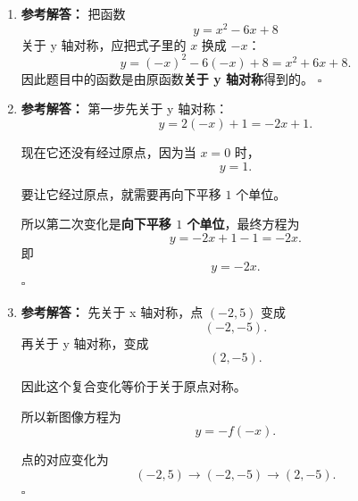 \documentclass[11pt,a4paper,fontset=fandol]{ctexart}
\newenvironment{solution}{\par\noindent\textbf{参考解答：}}{\hfill$\square$\par}
\begin{document}
\begin{enumerate}
  \item \begin{solution}
  把函数
  \[
  y=x^2-6x+8
  \]
  关于 y 轴对称，应把式子里的 $x$ 换成 $-x$：
  \[
  y=(-x)^2-6(-x)+8=x^2+6x+8.
  \]
  因此题目中的函数是由原函数\textbf{关于 y 轴对称}得到的。
  \end{solution}

  \item \begin{solution}
  第一步先关于 y 轴对称：
  \[
  y=2(-x)+1=-2x+1.
  \]

  现在它还没有经过原点，因为当 $x=0$ 时，
  \[
  y=1.
  \]

  要让它经过原点，就需要再向下平移 $1$ 个单位。

  所以第二次变化是\textbf{向下平移 $1$ 个单位}，最终方程为
  \[
  y=-2x+1-1=-2x.
  \]
  即
  \[
  \boxed{y=-2x}.
  \]
  \end{solution}

  \item \begin{solution}
  先关于 x 轴对称，点 $(-2,5)$ 变成
  \[
  (-2,-5).
  \]
  再关于 y 轴对称，变成
  \[
  (2,-5).
  \]

  因此这个复合变化等价于关于原点对称。

  所以新图像方程为
  \[
  \boxed{y=-f(-x)}.
  \]

  点的对应变化为
  \[
  (-2,5)\longrightarrow (-2,-5)\longrightarrow (2,-5).
  \]
  \end{solution}
\end{enumerate}
\end{document}
